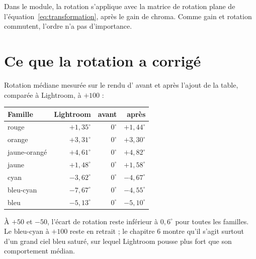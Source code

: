 Dans le module, la rotation s'applique avec la matrice de rotation plane de
l'équation~\eqref{eq:transformation}, après le gain de chroma. Comme gain et
rotation commutent, l'ordre n'a pas d'importance.

\section{Ce que la rotation a corrigé}
Rotation médiane mesurée sur le rendu d'\IPR{} avant et après l'ajout de la
table, comparée à Lightroom, à $+100$ :

\begin{center}
\begin{tabular}{lrrr}
\toprule
Famille & Lightroom & \IPR{} avant & \IPR{} après\\
\midrule
rouge & $+1{,}35^\circ$ & $0^\circ$ & $+1{,}44^\circ$\\
orange & $+3{,}31^\circ$ & $0^\circ$ & $+3{,}30^\circ$\\
jaune-orangé & $+4{,}61^\circ$ & $0^\circ$ & $+4{,}82^\circ$\\
jaune & $+1{,}48^\circ$ & $0^\circ$ & $+1{,}58^\circ$\\
cyan & $-3{,}62^\circ$ & $0^\circ$ & $-4{,}67^\circ$\\
bleu-cyan & $-7{,}67^\circ$ & $0^\circ$ & $-4{,}55^\circ$\\
bleu & $-5{,}13^\circ$ & $0^\circ$ & $-5{,}10^\circ$\\
\bottomrule
\end{tabular}
\end{center}

À $+50$ et $-50$, l'écart de rotation reste inférieur à $0{,}6^\circ$ pour toutes
les familles. Le bleu-cyan à $+100$ reste en retrait ; le chapitre 6 montre
qu'il s'agit surtout d'un grand ciel bleu saturé, sur lequel Lightroom pousse
plus fort que son comportement médian.

